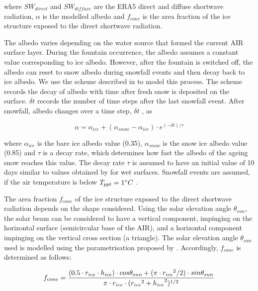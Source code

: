 \documentclass[utf8]{frontiersSCNS} %
\begin{document}
where $SW_{direct}$ and $SW_{diffuse}$ are the ERA5 direct and diffuse shortwave radiation, $\alpha$ is the modelled
albedo and $f_{cone}$ is the area fraction of the ice structure exposed to the direct shortwave radiation.

The albedo varies depending on the water source that formed the current AIR surface layer. During the fountain
occurrence, the albedo assumes a constant value corresponding to ice albedo. However, after the fountain is switched
off, the albedo can reset to snow albedo during snowfall events and then decay back to ice albedo. We use the scheme
described in \cite{OerlemansKnap_1998} to model this process. The scheme records the decay of albedo with time after
fresh snow is deposited on the surface. $\delta t$ records the number of time steps after the last snowfall event. After
snowfall, albedo changes over a time step, $\delta t$ , as

\begin{equation} \alpha=\alpha_{ice}+(\alpha_{snow}-\alpha_{ice}) \cdot e^{(-\delta t)/\tau} \label{eqn:a}
\end{equation}

where $\alpha_{ice}$ is the bare ice albedo value (0.35), $\alpha_{snow}$ is the snow ice albedo value (0.85) and $\tau$
is a decay rate, which determines how fast the albedo of the ageing snow reaches this value.  The decay rate $\tau$ is
assumed to have an initial value of 10 days similar to values obtained by \cite{Schmidt_2017} for wet surfaces. Snowfall
events are assumed, if the air temperature is below $T_{ppt}=1 \degree C$ \citep{FujitaAgeta_2000}.

The area fraction $f_{cone}$ of the ice structure exposed to the direct shortwave radiation depends on the shape
considered. Using the solar elevation angle $\theta_{sun}$, the solar beam can be considered to have a vertical
component, impinging on the horizontal surface (semicircular base of the AIR), and a horizontal component impinging on
the vertical cross section (a triangle). The solar elevation angle $\theta_{sun}$ used is modelled using the
parametrisation proposed by \cite{Woolf_1968}. Accordingly, $f_{cone}$ is determined as follows:

\begin{equation} \begin{split} f_{cone}& =\frac{(0.5 \cdot r_{ice} \cdot h_{ice}) \cdot cos \theta_{sun} +(\pi \cdot
			{r_{ice}}^2/2) \cdot sin \theta_{sun} }{\pi \cdot r_{ice} \cdot ({r_{ice}}^2+{h_{ice}}^2)^{1/2}}\\ \end{split}
	\label{eqn:f_{cone}} \end{equation}
\end{document}
